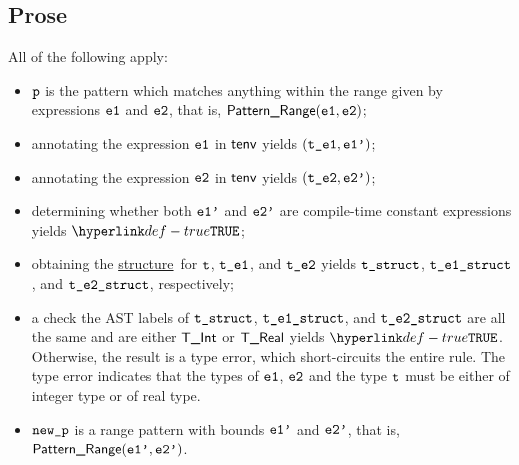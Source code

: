 \documentclass{book}
\newcommand\ProseOrTypeError[0]{\ProseTerminateAs{\TypeErrorConfig}}
\newcommand\structure[0]{\hyperlink{def-structure}{structure}}
\begin{document}
\subsection{Prose}
All of the following apply:
\begin{itemize}
  \item $\texttt{p}$ is the pattern which matches anything within the range given by
  expressions $\texttt{e1}$ and $\texttt{e2}$, that is, $\textsf{Pattern\_Range}(\texttt{e1}, \texttt{e2})$;
  \item annotating the expression $\texttt{e1}$ in $\textsf{tenv}$ yields $(\texttt{t\_e1}, \texttt{e1'})$\ProseOrTypeError;
  \item annotating the expression $\texttt{e2}$ in $\textsf{tenv}$ yields $(\texttt{t\_e2}, \texttt{e2'})$\ProseOrTypeError;
  \item determining whether both $\texttt{e1'}$ and $\texttt{e2'}$ are compile-time constant expressions yields $\True$\ProseOrTypeError;
  \item obtaining the \structure\ for $\texttt{t}$, $\texttt{t\_e1}$, and $\texttt{t\_e2}$ yields
        $\texttt{t\_struct}$, $\texttt{t\_e1\_struct}$, and $\texttt{t\_e2\_struct}$, respectively\ProseOrTypeError;
  \item a check the AST labels of $\texttt{t\_struct}$, $\texttt{t\_e1\_struct}$, and $\texttt{t\_e2\_struct}$ are all the same and are either
        $\textsf{T\_Int}$ or $\textsf{T\_Real}$ yields $\True$. Otherwise, the result is a type error, which short-circuits the entire rule.
        The type error indicates that the types of
        $\texttt{e1}$, $\texttt{e2}$ and the type $\texttt{t}$ must be either of integer type or of real type.
  \item $\texttt{new\_p}$ is a range pattern with bounds $\texttt{e1'}$ and $\texttt{e2'}$, that is, $\textsf{Pattern\_Range}(\texttt{e1'}, \texttt{e2'})$.
\end{itemize}


\end{document}
